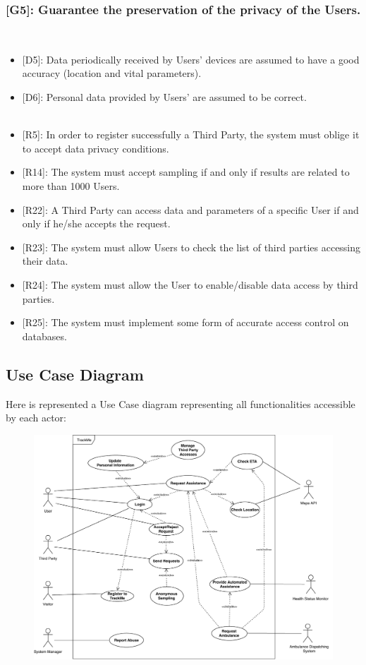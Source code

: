 \documentclass[12pt,a4paper]{article}
\begin{document}
	\subsubsection*{{[}{G5}{]}: Guarantee the preservation of the privacy of the Users.}
	\begin{itemize}\\
		\begin{itemize}
			\item {[D5]}: Data periodically received by Users' devices are assumed to have a good accuracy (location and vital parameters).
			\item {[D6]}: Personal data provided by Users' are assumed to be correct.
			\\ \\
			\item {[R5]}: In order to register successfully a Third Party, the system must oblige it to accept data privacy conditions.
			\item {[R14]}: The system must accept sampling if and only if results are related to more than 1000 Users.
			\item {[R22]}: A Third Party can access data and parameters of a specific User if and only if he/she accepts the request.
			\item {[R23]}: The system must allow Users to check the list of third parties accessing their data.
			\item {[R24]}: The system must allow the User to enable/disable data access by third parties.
			\item {[R25]}: The system must implement some form of accurate access control on databases.
		\end{itemize}
	\end{itemize}

	\newpage
	\subsection{Use Case Diagram}
	Here is represented a Use Case diagram representing all functionalities accessible by each actor:
	\begin{figure}[h]
		\centering
		\includegraphics[width=1.25\linewidth]{Images/use_case_diagram}
		\label{fig:use_case_diagram}
	\end{figure}
\end{document}
